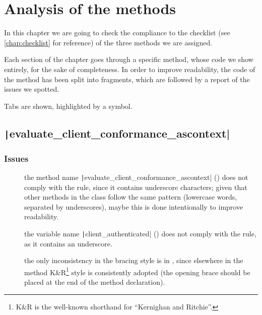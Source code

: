 \chapter{Analysis of the methods}\label{chap:problems}




In this chapter we are going to check the compliance to the checklist (see \cref{chap:checklist} for reference) of the three methods we are assigned. 

Each section of the chapter goes through a specific method, whose code we show entirely, for the sake of completeness. In order to improve readability, the code of the method has been split into fragments, which are followed by a report of the issues we spotted.

Tabs are shown, highlighted by a \FancyVerbTab\xspace symbol. 






\section{\normalfont\texttt|evaluate_client_conformance_ascontext|}




\subsection{Issues}


\begin{description}
	
	\item []
		the method name \texttt|evaluate_client_conformance_ascontext| () does not comply with the rule, since it contains underscore characters; given that other methods in the class follow the same pattern (lowercase words, separated by underscores), maybe this is done intentionally to improve readability.
	
	\item []
		the variable name \texttt|client_authenticated| () does not comply with the rule, as it contains an underscore. 
	
	\item []
		the only inconsistency in the bracing style is in , since elsewhere in the method K\&R\footnote{K\&R is the \mbox{well-known} shorthand for ``Kernighan and Ritchie''.} style is consistently adopted (the opening brace should be placed at the end of the method declaration).
		
\end{description}

